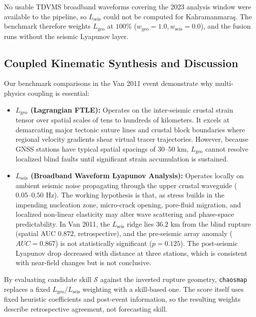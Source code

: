 \documentclass[11pt,a4paper]{article}
\begin{document}
No usable TDVMS broadband waveforms covering the 2023 analysis window were available to the pipeline, so $L_{\text{seis}}$ could not be computed for Kahramanmara\c{s}. The benchmark therefore weights $L_{\text{geo}}$ at $100\%$ ($w_{\text{geo}} = 1.0, w_{\text{seis}} = 0.0$), and the fusion runs without the seismic Lyapunov layer.

\subsection{Coupled Kinematic Synthesis and Discussion}
Our benchmark comparisons in the Van 2011 event demonstrate why multi-physics coupling is essential:
\begin{itemize}
    \item \textbf{$L_{\text{geo}}$ (Lagrangian FTLE):} Operates on the inter-seismic crustal strain tensor over spatial scales of tens to hundreds of kilometers. It excels at demarcating major tectonic suture lines and crustal block boundaries where regional velocity gradients shear virtual tracer trajectories. However, because GNSS stations have typical spatial spacings of $30\text{--}50\text{ km}$, $L_{\text{geo}}$ cannot resolve localized blind faults until significant strain accumulation is sustained.
    \item \textbf{$L_{\text{seis}}$ (Broadband Waveform Lyapunov Analysis):} Operates locally on ambient seismic noise propagating through the upper crustal waveguide ($0.05\text{--}0.50\text{ Hz}$). The working hypothesis is that, as stress builds in the impending nucleation zone, micro-crack opening, pore-fluid migration, and localized non-linear elasticity may alter wave scattering and phase-space predictability. In Van 2011, the $L_{\text{seis}}$ ridge lies $36.2\text{ km}$ from the blind rupture (spatial AUC $0.872$, retrospective), and the pre-seismic array anomaly ($AUC = 0.867$) is not statistically significant ($p = 0.125$). The post-seismic Lyapunov drop decreased with distance at three stations, which is consistent with near-field changes but is not conclusive.
\end{itemize}

By evaluating candidate skill $\mathcal{S}$ against the inverted rupture geometry, \texttt{chaosmap} replaces a fixed $L_{\text{geo}}$/$L_{\text{seis}}$ weighting with a skill-based one. The score itself uses fixed heuristic coefficients and post-event information, so the resulting weights describe retrospective agreement, not forecasting skill.
\end{document}
